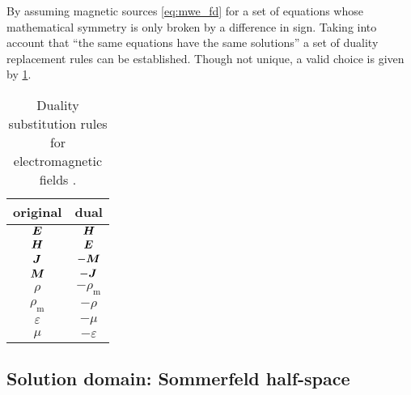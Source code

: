 By assuming magnetic sources \eqref{eq:mwe_fd} for a set of equations whose
mathematical symmetry is only broken by a difference in sign. Taking into
account that \enquote{the same equations have the same solutions}
\cite[12-1]{Feynman2011} a set of duality replacement rules can be established.
Though not unique, a valid choice is given by \cref{tab:duality}. 
\begin{table}[hbt]
	\centering
	\begin{tabular}{cc}
		\toprule%
		\textbf{original} & \textbf{dual}\\ \midrule
		$\pvec{E}$ & $\pvec{H}$ \\
		$\pvec{H}$ & $\pvec{E}$ \\
		$\pvec{J}$ & $-\pvec{M}$ \\
		$\pvec{M}$ & $-\pvec{J}$ \\
		$\rho$ & $-\rho_\mathrm{m}$ \\
		$\rho_\mathrm{m}$ & $-\rho$ \\
		$\varepsilon$ & $-\mu$ \\
		$\mu$ & $-\varepsilon$ \\
		\bottomrule
	\end{tabular}
	\caption[Duality substitution rules for electromagnetic fields]
	{Duality substitution rules for electromagnetic fields \cite[p.~9]{Chew1999}.}
	\label{tab:duality}
\end{table}

\subsection{Solution domain: Sommerfeld half-space}

	
		
		
